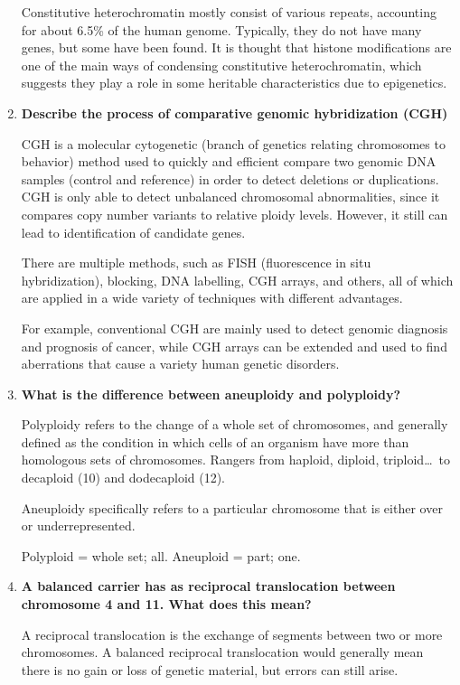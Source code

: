 \documentclass[basic]{inVerba-notes}
\begin{document}
\begin{enumerate}
    Constitutive heterochromatin mostly consist of various repeats, accounting for about 6.5\% of the human genome. Typically, they do not have many genes, but some have been found. It is thought that histone modifications are one of the main ways of condensing constitutive heterochromatin, which suggests they play a role in some heritable characteristics due to epigenetics. 

    \item \textbf{Describe the process of comparative genomic hybridization (CGH)}
    
    CGH is a molecular cytogenetic (branch of genetics relating chromosomes to behavior) method used to quickly and efficient compare two genomic DNA samples (control and reference) in order to detect deletions or duplications. CGH is only able to detect unbalanced chromosomal abnormalities, since it compares copy number variants to relative ploidy levels. However, it still can lead to identification of candidate genes.

    There are multiple methods, such as FISH (fluorescence in situ hybridization), blocking, DNA labelling, CGH arrays, and others, all of which are applied in a wide variety of techniques with different advantages.

    For example, conventional CGH are mainly used to detect genomic diagnosis and prognosis of cancer, while CGH arrays can be extended and used to find aberrations that cause a variety human genetic disorders. 
    
    \item \textbf{What is the difference between aneuploidy and polyploidy?}
    
    Polyploidy refers to the change of a whole set of chromosomes, and generally defined as the condition in which cells of an organism have more than homologous sets of chromosomes. Rangers from haploid, diploid, triploid\dots\ to decaploid (10) and dodecaploid (12).

    Aneuploidy specifically refers to a particular chromosome that is either over or underrepresented. 

    Polyploid = whole set; all. Aneuploid = part; one.

    \item \textbf{A balanced carrier has as reciprocal translocation between chromosome 4 and 11. What does this mean?}
    
    A reciprocal translocation is the exchange of segments between two or more chromosomes. A balanced reciprocal translocation would generally mean there is no gain or loss of genetic material, but errors can still arise. 


\end{enumerate}
\end{document}
